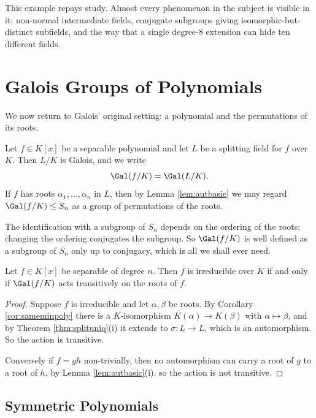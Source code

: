 This example repays study. Almost every phenomenon in the subject is visible in it: non-normal intermediate fields, conjugate subgroups giving isomorphic-but-distinct subfields, and the way that a single degree-$8$ extension can hide ten different fields.

\section{Galois Groups of Polynomials}\label{sec:polys}

We now return to Galois' original setting: a polynomial and the permutations of its roots.

\begin{definition}
	Let $f \in K[x]$ be a separable polynomial and let $L$ be a splitting field for $f$ over $K$. Then $L/K$ is Galois, and we write
	$$\Gal(f/K) = \Gal(L/K).$$
	If $f$ has roots $\alpha_1, \dots, \alpha_n$ in $L$, then by Lemma \ref{lem:autbasic} we may regard $\Gal(f/K) \leq S_n$ as a group of permutations of the roots.
\end{definition}

The identification with a subgroup of $S_n$ depends on the ordering of the roots; changing the ordering conjugates the subgroup. So $\Gal(f/K)$ is well defined as a subgroup of $S_n$ only up to conjugacy, which is all we shall ever need.

\begin{proposition}\label{prop:transitive}
	Let $f \in K[x]$ be separable of degree $n$. Then $f$ is irreducible over $K$ if and only if $\Gal(f/K)$ acts transitively on the roots of $f$.
\end{proposition}

\begin{proof}
	Suppose $f$ is irreducible and let $\alpha, \beta$ be roots. By Corollary \ref{cor:sameminpoly} there is a $K$-isomorphism $K(\alpha) \to K(\beta)$ with $\alpha \mapsto \beta$, and by Theorem \ref{thm:splituniq}(i) it extends to $\sigma : L \to L$, which is an automorphism. So the action is transitive.

	Conversely if $f = gh$ non-trivially, then no automorphism can carry a root of $g$ to a root of $h$, by Lemma \ref{lem:autbasic}(i), so the action is not transitive.
\end{proof}

\subsection{Symmetric Polynomials}

